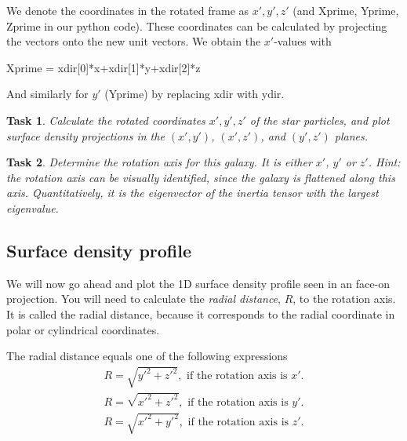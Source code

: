 \documentclass[11pt,a4paper]{article} %
\newtheorem{Exercise}{Task}
\begin{document}
We denote the coordinates in the rotated frame as $x',y',z'$ (and {\ttm Xprime}, {\ttm Yprime}, {\ttm Zprime} in our python code). These coordinates can be calculated by projecting the vectors onto the new unit vectors. We obtain the $x'$-values with
\begin{python}
Xprime = xdir[0]*x+xdir[1]*y+xdir[2]*z
\end{python}
And similarly for $y'$ ({\ttm Yprime}) by replacing xdir with ydir.

{\color{ForestGreen}
\begin{Exercise}
Calculate the rotated coordinates $x',y',z'$ of the star particles, and plot surface density projections in the $(x',y')$, $(x',z')$, and $(y',z')$ planes.
\end{Exercise}
\begin{Exercise}
Determine the rotation axis for this galaxy. It is either $x'$, $y'$ or $z'$. Hint: the rotation axis can be visually identified, since the galaxy is flattened along this axis. Quantitatively, it is the eigenvector of the inertia tensor with the largest eigenvalue.
\end{Exercise}
}

 
\subsection*{Surface density profile}


We will now go ahead and plot the 1D surface density profile seen in an face-on projection. You will need to calculate the \emph{radial distance}, $R$, to the rotation axis. It is called the radial distance, because it corresponds to the radial coordinate in polar or cylindrical coordinates.

The radial distance equals one of the following expressions 
\begin{align}
R=\sqrt{ y'^2 + z'^2}, \text{  if the rotation axis is } x'.\\
R=\sqrt{ x'^2 + z'^2}, \text{  if the rotation axis is } y'.\\
R=\sqrt{ x'^2 + y'^2}, \text{  if the rotation axis is } z'.
\end{align}
\end{document}
